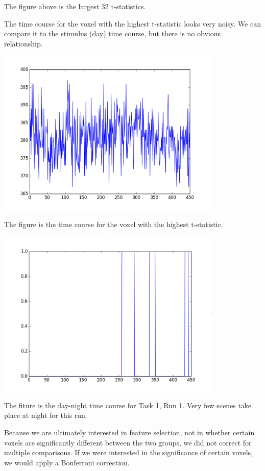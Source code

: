 The figure above is the largest 32 t-statistics.

The time course for the voxel with the highest t-statistic looks very noisy.
We can compare it to the stimulus (day) time course, but there is no obvious
relationship.


\begin{center}
\includegraphics[height=8cm]{4}
\end{center}

The figure is the time course for the voxel with the highest t-statistic.

\begin{center}
\includegraphics[height=8cm]{5}
\end{center}

The fiture is the day-night time course for Task 1, Run 1.  Very few scenes
take place at night for this run.

Because we are ultimately interested in feature selection, not in whether
certain voxels are significantly different between the two groups, we did not
correct for multiple comparisons.  If we were interested in the significance
of certain voxels, we would apply a Bonferroni correction.

